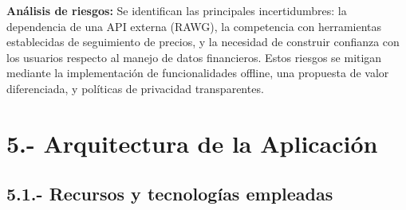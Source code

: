 \documentclass[
  spanish,
  11pt,
  paper=a4,
  ,captions=tableheading
]{scrartcl}
\begin{document}
\textbf{Análisis de riesgos:} Se identifican las principales
incertidumbres: la dependencia de una API externa (RAWG), la competencia
con herramientas establecidas de seguimiento de precios, y la necesidad
de construir confianza con los usuarios respecto al manejo de datos
financieros. Estos riesgos se mitigan mediante la implementación de
funcionalidades offline, una propuesta de valor diferenciada, y
políticas de privacidad transparentes.

\newpage

\hypertarget{arquitectura-de-la-aplicaciuxf3n}{%
\section{5.- Arquitectura de la
Aplicación}\label{arquitectura-de-la-aplicaciuxf3n}}

\hypertarget{recursos-y-tecnologuxedas-empleadas}{%
\subsection{5.1.- Recursos y tecnologías
empleadas}\label{recursos-y-tecnologuxedas-empleadas}}
\end{document}
